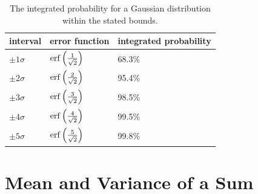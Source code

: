 \documentclass[12pt,oneside]{book}
\begin{document}
\begin{table}[thb]
\begin{center}
\begin{tabular}{lll}
interval & error function & integrated probability \\ 
\hline
$\pm1 \sigma$ & ${\rm erf}\left( \frac{1}{\sqrt{2}} \right)$ & 68.3\% \\
$\pm2 \sigma$ & ${\rm erf}\left( \frac{2}{\sqrt{2}} \right)$ & 95.4\% \\
$\pm3 \sigma$ & ${\rm erf}\left( \frac{3}{\sqrt{2}} \right)$ & 98.5\% \\
$\pm4 \sigma$ & ${\rm erf}\left( \frac{4}{\sqrt{2}} \right)$ & 99.5\% \\
$\pm5 \sigma$ & ${\rm erf}\left( \frac{5}{\sqrt{2}} \right)$ & 99.8\% \\ 
\end{tabular}
\caption{\label{tbl:erf} The integrated probability for a Gaussian distribution within the stated bounds.} 
\end{center}
\end{table}

\section{Mean and Variance of a Sum}
\end{document}
